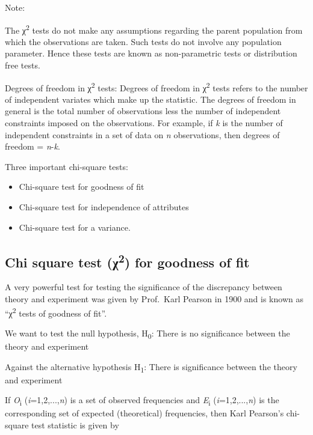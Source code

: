 \documentclass[
]{book}
\begin{document}
Note:

The χ\textsuperscript{2} tests do not make any assumptions regarding the parent population from which the observations are taken. Such tests do not involve any population parameter. Hence these tests are known as non-parametric tests or distribution free tests.

Degrees of freedom in χ\textsuperscript{2} tests: Degrees of freedom in χ\textsuperscript{2} tests refers to the number of independent variates which make up the statistic. The degrees of freedom in general is the total number of observations less the number of independent constraints imposed on the observations. For example, if \emph{k} is the number of independent constraints in a set of data on \emph{n} observations, then degrees of freedom = \emph{n}-\emph{k}.

Three important chi-square tests:

\begin{itemize}
\item
  Chi-square test for goodness of fit
\item
  Chi-square test for independence of attributes
\item
  Chi-square test for a variance.
\end{itemize}

\hypertarget{chi-square-test-ux3c72-for-goodness-of-fit}{%
\subsection{\texorpdfstring{Chi square test (χ\textsuperscript{2}) for goodness of fit}{Chi square test (χ2) for goodness of fit}}\label{chi-square-test-ux3c72-for-goodness-of-fit}}

A very powerful test for testing the significance of the discrepancy between theory and experiment was given by Prof.~Karl Pearson in 1900 and is known as ``χ\textsuperscript{2} tests of goodness of fit''.

We want to test the null hypothesis, H\textsubscript{0}: There is no significance between the theory and experiment

Against the alternative hypothesis H\textsubscript{1}: There is significance between the theory and experiment

If \emph{O}\textsubscript{i} (\emph{i}=1,2,...,\emph{n}) is a set of observed frequencies and \emph{E}\textsubscript{i} (\emph{i}=1,2,...,\emph{n}) is the corresponding set of expected (theoretical) frequencies, then Karl Pearson's chi-square test statistic is given by
\end{document}
